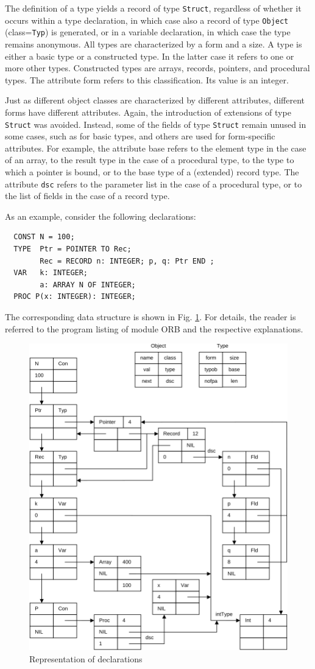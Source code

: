 The definition of a type yields a record of type \verb|Struct|, regardless of whether it occurs within
a type declaration, in which case also a record of type \verb|Object| (class=\verb|Typ|) is generated,
or in a variable declaration, in which case the type remains anonymous. All types are characterized by
a form and a size. A type is either a basic type or a constructed type. In the latter case it refers to
one or more other types. Constructed types are arrays, records, pointers, and procedural types. The
attribute form refers to this classification. Its value is an integer.

Just as different object classes are characterized by different attributes, different forms have
different attributes. Again, the introduction of extensions of type \verb|Struct| was avoided. Instead,
some of the fields of type \verb|Struct| remain unused in some cases, such as for basic types, and
others are used for form-specific attributes. For example, the attribute base refers to the element
type in the case of an array, to the result type in the case of a procedural type, to the type to which
a pointer is bound, or to the base type of a (extended) record type. The attribute \verb|dsc| refers
to the parameter list in the case of a procedural type, or to the list of fields in the case of
a record type.

As an example, consider the following declarations:
\begin{verbatim}
  CONST N = 100;
  TYPE  Ptr = POINTER TO Rec;
        Rec = RECORD n: INTEGER; p, q: Ptr END ;
  VAR   k: INTEGER;
        a: ARRAY N OF INTEGER;
  PROC P(x: INTEGER): INTEGER;
\end{verbatim}

The corresponding data structure is shown in Fig. \ref{fig:declrep}. For details, the reader is
referred to the program listing of module ORB and the respective explanations.
\begin{figure}[h!]
  \centering
  \includegraphics[width=.8\textwidth]{i/C/5.png}
  \caption{Representation of declarations}
  \label{fig:declrep}
\end{figure}

